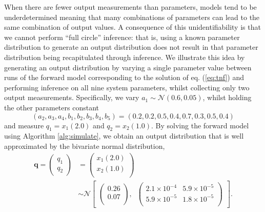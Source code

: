 %
When there are fewer output measurements than parameters, models tend to be underdetermined meaning that many combinations of parameters can lead to the same combination of output values. A consequence of this unidentifiability is that we cannot perform ``full circle'' inference: that is, using a known parameter distribution to generate an output distribution does not result in that parameter distribution being recapitulated through inference. We illustrate this idea by generating an output distribution by varying a single parameter value between runs of the forward model corresponding to the solution of eq. (\ref{eq:tnf}) and performing inference on all nine system parameters, whilst collecting only two output measurements. Specifically, we vary $a_1\sim \mathcal{N}(0.6, 0.05)$, whilst holding the other parameters constant $$(a_2,a_3,a_4,b_1,b_2,b_3,b_4,b_5)=(0.2, 0.2, 0.5, 0.4, 0.7, 0.3, 0.5, 0.4)$$ and measure $q_1=x_1(2.0)$ and $q_2=x_2(1.0)$. By solving the forward model using Algorithm \ref{alg:simulate}, we obtain an output distribution that is well approximated by the bivariate normal distribution,
%
\begin{equation}\label{eq:tnf_circular_target}
\begin{aligned}
\boldsymbol{q} = \begin{pmatrix} q_1 \\ q_2 \end{pmatrix}
&=
\begin{pmatrix}
x_1(2.0)\\
x_2(1.0)\\
\end{pmatrix} \\
&\sim  \mathcal{N}
\begin{bmatrix}
\begin{pmatrix}
0.26\\
0.07\\
\end{pmatrix}, \;\;
\begin{pmatrix}
2.1\times 10^{-4} & 5.9\times 10^{-5}\\
5.9\times 10^{-5} & 1.8\times 10^{-5}\\
\end{pmatrix}
\end{bmatrix}.
\end{aligned}
\end{equation}
%
